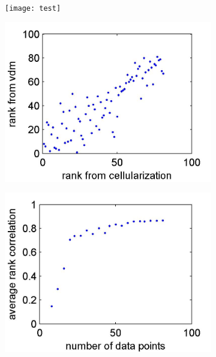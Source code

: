 \documentclass{pnastwo}
\begin{document}
\begin{figure}
\begin{minipage}{0.6\textwidth}
\begin{subfigure}{\textwidth}
\texttt{[image: test]}
\caption{}
\label{subfig:images_vdm}
\end{subfigure}
\end{minipage}
\begin{minipage}{0.4\textwidth}
\begin{subfigure}{\textwidth}
\includegraphics[width=\textwidth]{rank_corr_vdm}
\caption{}
\label{subfig:rank_corr}
\end{subfigure}
\begin{subfigure}{\textwidth}
\includegraphics[width=\textwidth]{bootstrap_rank_corr_color}

\end{subfigure}
\end{minipage}
\end{figure}
\end{document}
